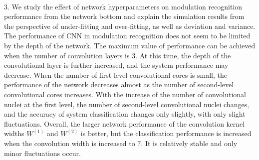 \begin{englishabstract}
\par~\par
3. We study the effect of network hyperparameters on modulation recognition performance from the network bottom and explain the simulation results from the perspective of under-fitting and over-fitting, as well as deviation and variance. The performance of CNN in modulation recognition does not seem to be limited by the depth of the network. The maximum value of performance can be achieved when the number of convolution layers is $3$. At this time, the depth of the convolutional layer is further increased, and the system performance may decrease. When the number of first-level convolutional cores is small, the performance of the network decreases almost as the number of second-level convolutional cores increases. With the increase of the number of convolutional nuclei at the first level, the number of second-level convolutional nuclei changes, and the accuracy of system classification changes only slightly, with only slight fluctuations. Overall, the larger network performance of the convolution kernel widths $W^{(1)}$ and $W^{(2)}$ is better, but the classification performance is increased when the convolution width is increased to $7$. It is relatively stable and only minor fluctuations occur.
~\par
{}

\end{englishabstract}



\XDUpremainmatter

